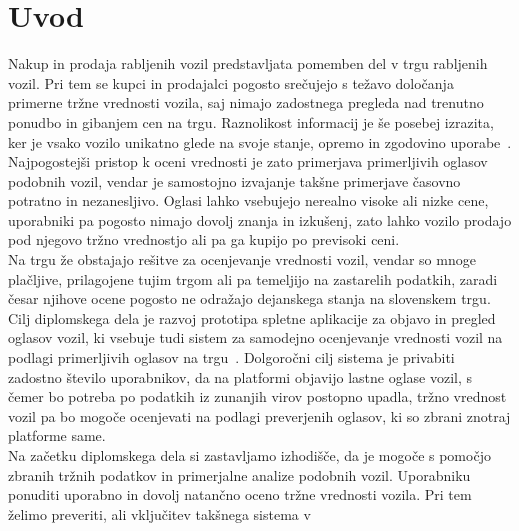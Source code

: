\documentclass[a4paper,12pt,openright]{book}
\begin{document}


\mainmatter
\setcounter{page}{1}
\pagestyle{fancy}


\chapter{Uvod}
\label{ch:uvod}

Nakup in prodaja rabljenih vozil predstavljata pomemben del v trgu rabljenih vozil.
Pri tem se kupci in prodajalci pogosto srečujejo s težavo določanja primerne tržne
vrednosti vozila, saj nimajo zadostnega pregleda nad trenutno ponudbo in gibanjem cen na
trgu. Raznolikost informacij je še posebej izrazita,
ker je vsako vozilo unikatno glede na svoje stanje, opremo in zgodovino
uporabe~\cite{gegic2019car,eurotax}.\\ Najpogostejši pristop k oceni vrednosti je zato primerjava
 primerljivih oglasov podobnih vozil, vendar je samostojno izvajanje takšne
primerjave časovno potratno in nezanesljivo. Oglasi lahko vsebujejo nerealno visoke ali nizke cene,
uporabniki pa pogosto nimajo dovolj znanja in izkušenj, zato lahko vozilo prodajo pod njegovo tržno
vrednostjo ali pa ga kupijo po previsoki ceni.\\
Na trgu že obstajajo rešitve za ocenjevanje vrednosti vozil, vendar so mnoge plačljive, 
prilagojene tujim trgom ali pa temeljijo na zastarelih podatkih, zaradi česar njihove ocene
pogosto ne odražajo dejanskega stanja na slovenskem trgu.\\
Cilj diplomskega dela je razvoj prototipa spletne aplikacije za objavo in pregled oglasov
vozil, ki vsebuje tudi sistem za samodejno ocenjevanje vrednosti vozil na podlagi
primerljivih oglasov na trgu~\cite{laender2002}.
Dolgoročni cilj sistema je privabiti zadostno število uporabnikov, da na platformi
objavijo lastne oglase vozil, s čemer bo potreba po podatkih iz zunanjih virov
postopno upadla, tržno vrednost vozil pa bo mogoče ocenjevati na podlagi preverjenih oglasov, ki so zbrani
znotraj platforme same.\\
Na začetku diplomskega dela si zastavljamo izhodišče, da je mogoče s pomočjo zbranih tržnih podatkov in
primerjalne analize podobnih vozil. Uporabniku ponuditi uporabno in dovolj natančno oceno
tržne vrednosti vozila. Pri tem želimo preveriti, ali vključitev takšnega sistema v
\end{document}
